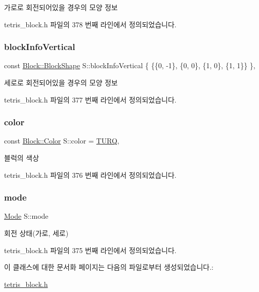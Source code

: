 가로로 회전되어있을 경우의 모양 정보 



tetris\+\_\+block.\+h 파일의 378 번째 라인에서 정의되었습니다.

\mbox{\label{class_s_a4dfa7559187c41616256612400bcaab7}} 
\subsubsection{\texorpdfstring{block\+Info\+Vertical}{blockInfoVertical}}
{\footnotesize\ttfamily const \mbox{\hyperlink{class_block_aca5d951639f113e2ebd7856209d6b9ab}{Block\+::\+Block\+Shape}} S\+::block\+Info\+Vertical \{ \{\{0, -\/1\}, \{0, 0\}, \{1, 0\}, \{1, 1\}\} \}\hspace{0.3cm}{\ttfamily [static]}, {\ttfamily [private]}}



세로로 회전되어있을 경우의 모양 정보 



tetris\+\_\+block.\+h 파일의 377 번째 라인에서 정의되었습니다.

\mbox{\label{class_s_a21faa1a841e2e11d5b9853bdfd0583df}} 
\subsubsection{\texorpdfstring{color}{color}}
{\footnotesize\ttfamily const \mbox{\hyperlink{class_block_ad054b4ac51df79aa910040b2a2fdf7b5}{Block\+::\+Color}} S\+::color = \mbox{\hyperlink{class_block_ad054b4ac51df79aa910040b2a2fdf7b5aa6acf45f9e85e879c50413b30769006a}{T\+U\+RQ}}\hspace{0.3cm}{\ttfamily [static]}, {\ttfamily [private]}}



블럭의 색상 



tetris\+\_\+block.\+h 파일의 376 번째 라인에서 정의되었습니다.

\mbox{\label{class_s_a0a3c150f9afbfe65a5558d947b999776}} 
\subsubsection{\texorpdfstring{mode}{mode}}
{\footnotesize\ttfamily \mbox{\hyperlink{class_block_a33a96023993478ad4b52426188454765}{Mode}} S\+::mode\hspace{0.3cm}{\ttfamily [private]}}



회전 상태(가로, 세로) 



tetris\+\_\+block.\+h 파일의 375 번째 라인에서 정의되었습니다.



이 클래스에 대한 문서화 페이지는 다음의 파일로부터 생성되었습니다.\+:\begin{DoxyCompactItemize}
\item 
\mbox{\hyperlink{tetris__block_8h}{tetris\+\_\+block.\+h}}\end{DoxyCompactItemize}
